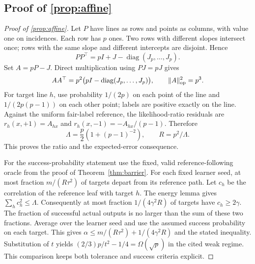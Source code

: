 \subsection[Proof of result affine]{Proof of \cref{prop:affine}}\label{proof:affine}
\begin{proof}[Proof of \cref{prop:affine}]
Let $P$ have lines as rows and points as columns, with value one on incidences. Each row has $p$ ones. Two rows with different slopes intersect once; rows with the same slope and different intercepts are disjoint. Hence
\[
 PP^\top=pI+J-\operatorname{diag}(J_p,\ldots,J_p).
\]
Set $A=pP-J$. Direct multiplication using $PJ=pJ$ gives
\[
 AA^\top=p^2\bigl(pI-\operatorname{diag}(J_p,\ldots,J_p)\bigr),
 \qquad \|A\|_{\rm op}^2=p^3.
\]
For target line $h$, use probability $1/(2p)$ on each point of the line and $1/(2p(p-1))$ on each other point; labels are positive exactly on the line. Against the uniform fair-label reference, the likelihood-ratio residuals are $r_h(x,+1)=A_{hx}$ and $r_h(x,-1)=-A_{hx}/(p-1)$. Therefore
\[
 \Lambda=\frac p2(1+(p-1)^{-2}),\qquad R=p^2/\Lambda.
\]
This proves the ratio and the expected-error consequence.

For the success-probability statement use the fixed, valid reference-following oracle from the proof of Theorem~\ref{thm:barrier}. For each fixed learner seed, at most fraction $m/(R\tau^2)$ of targets depart from its reference path. Let $c_h$ be the correlation of the reference leaf with target $h$. The energy lemma gives $\sum_hc_h^2\le\Lambda$. Consequently at most fraction $1/(4\gamma^2R)$ of targets have $c_h\ge2\gamma$. The fraction of successful actual outputs is no larger than the sum of these two fractions. Average over the learner seed and use the assumed success probability on each target. This gives $\alpha\le m/(R\tau^2)+1/(4\gamma^2R)$ and the stated inequality. Substitution of $t$ yields $(2/3)p/t^2-1/4=\Omega(\sqrt p)$ in the cited weak regime. This comparison keeps both tolerance and success criteria explicit.
\end{proof}

